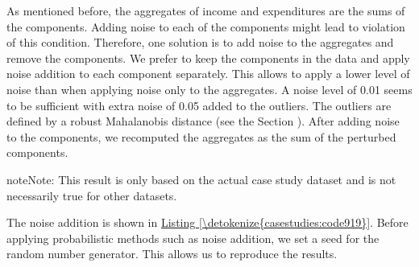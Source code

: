 \documentclass[letterpaper,10pt,english]{sphinxmanual}
\begin{document}
As mentioned before, the aggregates of income and expenditures are the
sums of the components. Adding noise to each of the components might
lead to violation of this condition. Therefore, one solution is to add
noise to the aggregates and remove the components. We prefer to keep the
components in the data and apply noise addition to each component
separately. This allows to apply a lower level of noise than when
applying noise only to the aggregates. A noise level of 0.01 seems to be
sufficient with extra noise of 0.05 added to the outliers. The outliers
are defined by a robust Mahalanobis distance
(see the Section ). After
adding noise to the components, we recomputed the aggregates as the sum
of the perturbed components.

\begin{sphinxadmonition}{note}{Note:}
This result is only based on the actual case study dataset and is not necessarily true for other datasets.
\end{sphinxadmonition}

The noise addition is shown in \hyperref[\detokenize{casestudies:code919}]{Listing \ref{\detokenize{casestudies:code919}}}. Before applying
probabilistic methods such as noise addition, we set a seed for the
random number generator. This allows us to reproduce the results.
\end{document}
